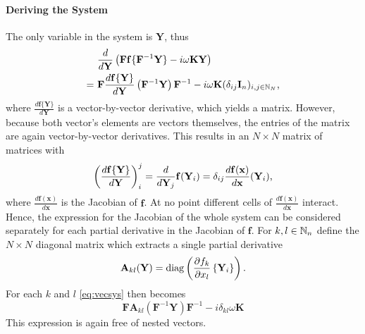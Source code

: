 \paragraph{Deriving the System} %
The only variable in the system is $\mathbf Y$, thus
	\begin{align}
		& \frac{d}{d\mathbf Y} \left( \mathbf{F} \mathbf{f}\{\mathbf{F}^{-1} \mathbf{Y}\} - i \omega \mathbf K \mathbf Y \right) \nonumber \\
		=\ & \mathbf{F} \frac{d \mathbf{f}\{\mathbf Y\}}{d\mathbf Y} \left( \mathbf{F}^{-1} \mathbf{Y} \right) \mathbf{F}^{-1} - i \omega \mathbf K (\delta_{ij} \mathbf I_n)_{i,j \in \mathbb{N}_N} \label{eq:vecsys} \text,
	\end{align}
where $\frac{d \mathbf{f} \{ \mathbf Y \}}{d \mathbf Y}$ is a vector-by-vector derivative, which yields a matrix.
However, because both vector's elements are vectors themselves, the entries of the matrix are again vector-by-vector derivatives.
This results in an $N \times N$ matrix of matrices with
	\[
			\left( \frac{d \mathbf{f}\{\mathbf Y\}}{d\mathbf Y} \right)_i^j = \frac{d}{d\mathbf Y_j} \mathbf f (\mathbf Y_i) = \delta_{ij} \frac{d \mathbf f(\mathbf x)}{d \mathbf x}(\mathbf Y_i) \text, %
	\]
where $\frac{d \mathbf f(\mathbf x)}{d\mathbf x}$ is the Jacobian of $\mathbf f$.
At no point different cells of $\frac{d \mathbf f(\mathbf x)}{d\mathbf x}$ interact.
Hence, the expression for the Jacobian of the whole system can be considered separately for each partial derivative in the Jacobian of $\mathbf f$.
For $k,l \in \mathbb{N}_n$ define the $N \times N$ diagonal matrix which extracts a single partial derivative
	\[
		\mathbf A_{kl}(\mathbf Y) = \operatorname{diag}\left( \frac{\partial f_k}{\partial x_l} \left\{\mathbf Y_i\right\} \right) \text.
	\]
For each $k$ and $l$ \autoref{eq:vecsys} then becomes
	\begin{equation}
		\mathbf{F} \mathbf A_{kl}(\mathbf{F}^{-1} \mathbf{Y}) \mathbf{F}^{-1} - i \delta_{kl} \omega \mathbf K
	\label{eq:syssingle}
	\end{equation}
This expression is again free of nested vectors.

